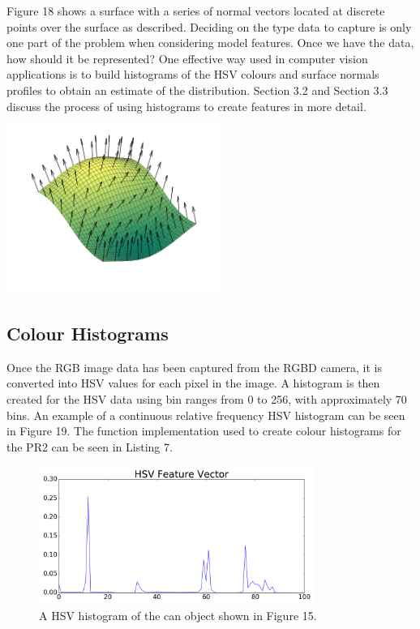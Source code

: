 \documentclass[a4paper]{article}
\begin{document}
\begin{minipage}{0.45\textwidth}
Figure 18 shows a surface with a series of normal vectors located at discrete points over the surface as described. Deciding on the type data to capture is only one part of the problem when considering model features. Once we have the data, how should it be represented? One effective way used in computer vision applications is to build histograms of the HSV colours and surface normals profiles to obtain an estimate of the distribution. Section 3.2 and Section 3.3 discuss the process of using histograms to create features in more detail.
\end{minipage}
	\hspace{1cm}
\begin{minipage}{0.45\textwidth}
	\centering
	\includegraphics[height=5.5cm]{surface_normals}
\end{minipage}


\subsection{Colour Histograms}
Once the RGB image data has been captured from the RGBD camera, it is converted into HSV values for each pixel in the image. A histogram is then created for the HSV data using bin ranges from 0 to 256, with approximately 70 bins. An example of a continuous relative frequency HSV histogram can be seen in Figure 19. The function implementation used to create colour histograms for the PR2 can be seen in Listing 7.
\begin{figure}[h]
	\centering
	\includegraphics[height=4.5cm]{hsv_histo}
	\caption{A HSV histogram of the can object shown in Figure 15.}
\end{figure}
\end{document}

